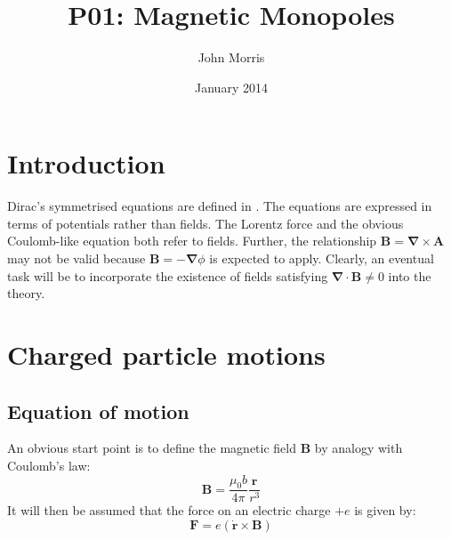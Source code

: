 \documentclass[twocolumn]{article}
\begin{document}
\title{P01: Magnetic Monopoles} %
\author{John Morris}%
\date{January 2014} %

\section{Introduction}
\label{sec:Introduction}
Dirac's symmetrised equations are defined in \cite{Paper01}. The equations are expressed in terms of potentials rather than fields. The Lorentz force and the obvious Coulomb-like equation both refer to fields. Further, the relationship $ \mathbf{B} =  \mathbf{\nabla} \times  \mathbf{A}$ may not be valid because $ \mathbf{B} = -  \mathbf{\nabla} \phi $ is expected to apply. Clearly, an eventual task will be to incorporate the existence of fields satisfying $ \mathbf{\nabla} \cdot  \mathbf{B} \neq 0$ into the theory.
\section{Charged particle motions}
\label{sec:Charged particles in a monopole field}
\subsection{Equation of motion}
An obvious start point is to define the magnetic field $\mathbf{B}$ by analogy with Coulomb's law:
\begin{equation}
\label{eq:E1}
\mathbf{B} = \frac {\mu_0 b}{4 \pi}\frac {\mathbf{r}}{r^3}
\end{equation}
It will then be assumed that the force on an electric charge $+e$ is given by:
\begin{equation}
\label{eq:E2}
\mathbf{F} = e ( \mathbf{\dot{r}} \times \mathbf{B} )
\end{equation}
\end{document}
